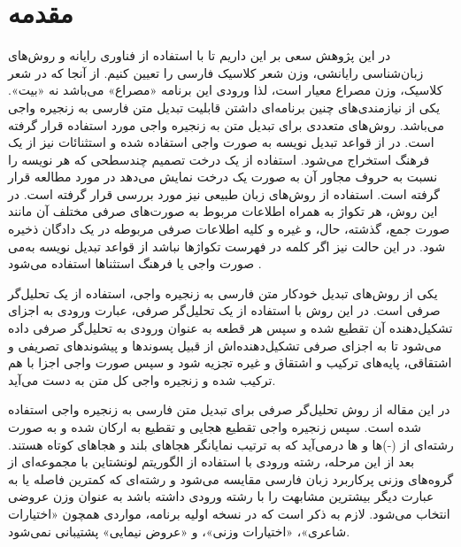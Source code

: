 \documentclass[12pt,onecolumn,a4paper]{article}
\begin{document}
    \section{مقدمه}
    در این پژوهش سعی بر این داریم تا با استفاده از فناوری رایانه و روش‌های زبان‌شناسی رایانشی، وزن شعر کلاسیک فارسی را تعیین کنیم. از آنجا که در شعر کلاسیک، وزن مصراع معیار است، لذا ورودی این برنامه «مصراع» می‌باشد نه «بیت». یکی از نیازمندی‌های چنین برنامه‌ای داشتن قابلیت تبدیل متن فارسی به زنجیره واجی می‌باشد. روش‌های متعددی برای تبدیل متن به زنجیره واجی مورد استفاده قرار گرفته است. در  از قواعد تبدیل نویسه به صورت واجی استفاده شده و استثنائات نیز از یک فرهنگ استخراج می‌شود. استفاده از یک درخت تصمیم چندسطحی که هر نویسه را نسبت به حروف مجاور آن به صورت یک درخت نمایش می‌دهد در  مورد مطالعه قرار گرفته است. استفاده از روش‌های زبان طبیعی نیز مورد بررسی قرار گرفته است. در این روش، هر تکواژ به همراه اطلاعات مربوط به صورت‌های صرفی مختلف آن مانند صورت جمع، گذشته، حال، و غیره و کلیه اطلاعات صرفی مربوطه در یک دادگان ذخیره می‎‌شود. در این حالت نیز اگر کلمه در فهرست تکواژها نباشد از قواعد تبدیل نویسه به صورت واجی یا فرهنگ استثناها استفاده می‌شود {\mfo\citep{sayad_75}}.
    \par
    یکی از روش‌های تبدیل خودکار متن فارسی به زنجیره واجی، استفاده از یک تحلیل‌گر صرفی است. در این روش با استفاده از یک تحلیل‌گر صرفی، عبارت ورودی به اجزای تشکیل‌دهنده آن تقطیع شده و سپس هر قطعه به عنوان ورودی به تحلیل‌گر صرفی داده می‌شود تا به اجزای صرفی تشکیل‌دهنده‌اش از قبیل پسوندها و پیشوندهای تصریفی و اشتقاقی، پایه‌های ترکیب و اشتقاق و غیره تجزیه شود و سپس صورت واجی اجزا با هم ترکیب شده و زنجیره واجی کل متن به دست می‌آید.
    \par
    در این مقاله از روش تحلیل‌گر صرفی برای تبدیل متن فارسی به زنجیره واجی استفاده شده است. سپس زنجیره واجی تقطیع هجایی و تقطیع به ارکان شده و به صورت رشته‌ای از (-)ها و ها درمی‌آید که به ترتیب نمایانگر هجاهای بلند و هجاهای کوتاه هستند. بعد از این مرحله، رشته ورودی با استفاده از الگوریتم لونشتاین با مجموعه‌ای از گروه‌های وزنی پرکاربرد زبان فارسی مقایسه می‌شود و رشته‌ای که کمترین فاصله یا به عبارت دیگر بیشترین مشابهت را با رشته ورودی داشته باشد به عنوان وزن عروضی انتخاب می‌شود. لازم به ذکر است که در نسخه اولیه برنامه، مواردی همچون «اختیارات شاعری»، «اختیارات وزنی»، و «عروض نیمایی» پشتیبانی نمی‌شود.
\end{document}

